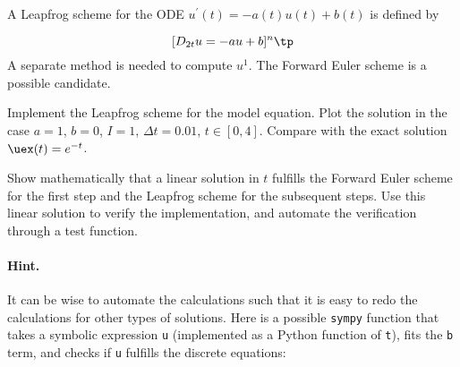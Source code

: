 \documentclass[graybox,sectrefs,envcountresetchap,open=right,final]{svmonodo}
\makeatletter
\newenvironment{doconceexercise}{}{}
\newcounter{doconceexercisecounter}%
\newcommand\listofexercises{
\chapter*{List of Exercises, Problems, and Projects
          \@mkboth{List of Exercises, Problems, and Projects}{List of Exercises, Problems, and Projects}}
\markboth{List of Exercises, Problems, and Projects}{List of Exercises, Problems, and Projects}
\@starttoc{loe}
}
\makeatother
\begin{document}
\begin{doconceexercise}

                
\label{decay:fd2:exer:leapfrog1}

A Leapfrog scheme
for the ODE $u^{\prime}(t) = -a(t)u(t) + b(t)$ is defined by

\begin{equation}
\lbrack D_{2t}u = -au+b\rbrack^n\tp
\label{decay:fd2:exer:leapfrog1:scheme}
\end{equation}
A separate method is needed to compute $u^1$. The Forward Euler
scheme is a possible candidate.

Implement the Leapfrog scheme for the model equation.
Plot the solution in the case $a=1$, $b=0$, $I=1$,
$\Delta t = 0.01$, $t\in [0,4]$. Compare with the exact
solution $\uex(t)=e^{-t}$.


Show mathematically that a linear solution in $t$ fulfills the
Forward Euler scheme for the first step and the Leapfrog scheme
for the subsequent steps. Use this linear solution to verify
the implementation, and automate the verification through a test
function.


\paragraph{Hint.}
It can be wise to automate the calculations such that it is easy to
redo the calculations for other types of solutions. Here is
a possible \texttt{sympy} function that takes a symbolic expression \texttt{u}
(implemented as a Python function of \texttt{t}), fits the \texttt{b} term, and
checks if \texttt{u} fulfills the discrete equations:































\end{doconceexercise}
\end{document}
